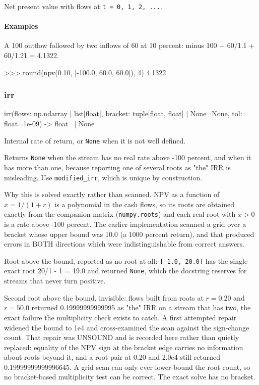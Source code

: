 \documentclass[10pt,a4paper,twoside]{report}
\begin{document}
Net present value with flows at \texttt{t = 0, 1, 2, ...}.

\paragraph*{Examples}

A 100 outflow followed by two inflows of 60 at 10 percent: minus 100 + 60/1.1 + 60/1.21 = 4.1322.

\begin{doctestblock}
>>> round(npv(0.10, [-100.0, 60.0, 60.0]), 4)
4.1322
\end{doctestblock}

\subsubsection*{irr}

\begin{verbatimsmall}
irr(flows: np.ndarray | list[float], bracket: tuple[float, float] | None=None, tol: float=1e-09) -> float 
    \ | None
\end{verbatimsmall}

Internal rate of return, or \texttt{None} when it is not well defined.

Returns \texttt{None} when the stream has no real rate above -100 percent, and when it has more than one, because reporting one of several roots as "the" IRR is misleading. Use \texttt{modified\_irr}, which is unique by construction.

Why this is solved exactly rather than scanned. NPV as a function of $x = 1/(1+r)$ is a polynomial in the cash flows, so its roots are obtained exactly from the companion matrix (\texttt{numpy.roots}) and each real root with $x > 0$ is a rate above -100 percent. The earlier implementation scanned a grid over a bracket whose upper bound was 10.0 (a 1000 percent return), and that produced errors in BOTH directions which were indistinguishable from correct answers.

Root above the bound, reported as no root at all: \texttt{[-1.0, 20.0]} has the single exact root 20/1 - 1 = 19.0 and returned \texttt{None}, which the docstring reserves for streams that never turn positive.

Second root above the bound, invisible: flows built from roots at $r = 0.20$ and $r = 50.0$ returned 0.19999999999995 as "the" IRR on a stream that has two, the exact failure the multiplicity check exists to catch. A first attempted repair widened the bound to 1e4 and cross-examined the scan against the sign-change count. That repair was UNSOUND and is recorded here rather than quietly replaced: equality of the NPV sign at the bracket edge carries no information about roots beyond it, and a root pair at 0.20 and 2.0e4 still returned 0.19999999999996645. A grid scan can only ever lower-bound the root count, so no bracket-based multiplicity test can be correct. The exact solve has no bracket.
\end{document}
